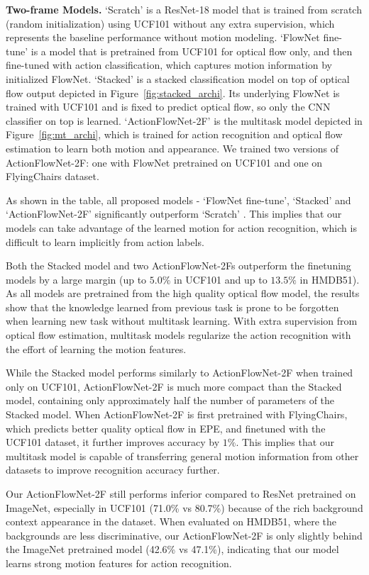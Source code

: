 \documentclass[10pt,twocolumn,letterpaper]{article}
\begin{document}
\textbf{Two-frame Models.}
`Scratch' is a ResNet-18 model that is trained from scratch (random initialization) using UCF101 without any extra supervision, which represents the baseline performance without motion modeling.
`FlowNet fine-tune' is a model that is pretrained from UCF101 for optical flow only, and then fine-tuned with action classification, which captures motion information by initialized FlowNet.
`Stacked' is a stacked classification model on top of optical flow output depicted in Figure~\ref{fig:stacked_archi}. Its underlying FlowNet is trained with UCF101 and is fixed to predict optical flow, so only the CNN classifier on top is learned.
`ActionFlowNet-2F' is the multitask model depicted in Figure~\ref{fig:mt_archi}, which is trained for action recognition and optical flow estimation to learn both motion and appearance.
We trained two versions of ActionFlowNet-2F: one with FlowNet pretrained on UCF101 and one on FlyingChairs dataset.

As shown in the table, all proposed models - `FlowNet fine-tune', `Stacked' and `ActionFlowNet-2F' significantly outperform `Scratch' .
This implies that our models can take advantage of the learned motion for action recognition, which is difficult to learn implicitly from action labels.

Both the Stacked model and two ActionFlowNet-2Fs outperform the finetuning models by a large margin (up to $5.0\%$ in UCF101 and up to $13.5\%$ in HMDB51).
As all models are pretrained from the high quality optical flow model, the results show that the knowledge learned from previous task is prone to be forgotten when learning new task without multitask learning.
With extra supervision from optical flow estimation, multitask models regularize the action recognition with the effort of learning the motion features.

While the Stacked model performs similarly to ActionFlowNet-2F when trained only on UCF101, ActionFlowNet-2F is much more compact than the Stacked model, containing only approximately half the number of parameters of the Stacked model.
When ActionFlowNet-2F is first pretrained with FlyingChairs, which predicts better quality optical flow in EPE, and finetuned with the UCF101 dataset, it further improves accuracy by $1\%$.
This implies that our multitask model is capable of transferring general motion information from other datasets to improve recognition accuracy further.

Our ActionFlowNet-2F still performs inferior compared to ResNet pretrained on ImageNet, especially in UCF101 (71.0\% vs 80.7\%) because of the rich background context appearance in the dataset. When evaluated on HMDB51, where the backgrounds are less discriminative, our ActionFlowNet-2F is only slightly behind the ImageNet pretrained model (42.6\% vs 47.1\%), indicating that our model learns strong motion features for action recognition. 
\end{document}

